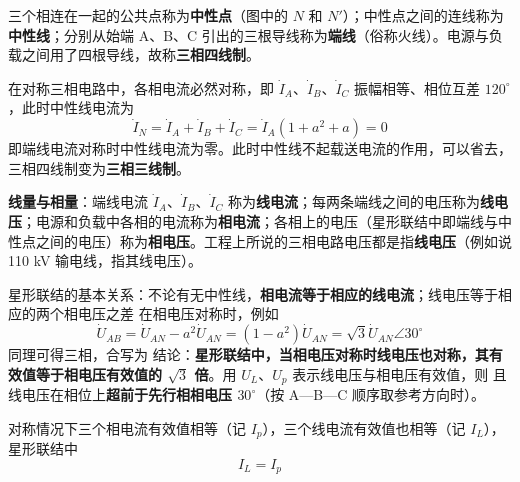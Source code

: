三个相连在一起的公共点称为\textbf{中性点}（图中的 $N$ 和 $N'$）；中性点之间的连线称为\textbf{中性线}；分别从始端 A、B、C 引出的三根导线称为\textbf{端线}（俗称火线）。电源与负载之间用了四根导线，故称\textbf{三相四线制}。

在对称三相电路中，各相电流必然对称，即 $\dot{I}_A$、$\dot{I}_B$、$\dot{I}_C$ 振幅相等、相位互差 $120^\circ$，此时中性线电流为
\begin{equation}
\dot{I}_N=\dot{I}_A+\dot{I}_B+\dot{I}_C=\dot{I}_A\left(1+a^2+a\right)=0
\end{equation}
即端线电流对称时中性线电流为零。此时中性线不起载送电流的作用，可以省去，三相四线制变为\textbf{三相三线制}。

\textbf{线量与相量}：端线电流 $\dot{I}_A$、$\dot{I}_B$、$\dot{I}_C$ 称为\textbf{线电流}；每两条端线之间的电压称为\textbf{线电压}；电源和负载中各相的电流称为\textbf{相电流}；各相上的电压（星形联结中即端线与中性点之间的电压）称为\textbf{相电压}。工程上所说的三相电路电压都是指\textbf{线电压}（例如说 110 kV 输电线，指其线电压）。

星形联结的基本关系：不论有无中性线，\textbf{相电流等于相应的线电流}；线电压等于相应的两个相电压之差
在相电压对称时，例如
\begin{equation}
\dot{U}_{AB}=\dot{U}_{AN}-a^2\dot{U}_{AN}=\left(1-a^2\right)\dot{U}_{AN}=\sqrt{3}\dot{U}_{AN}\angle30^\circ
\end{equation}
同理可得三相，合写为
结论：\textbf{星形联结中，当相电压对称时线电压也对称，其有效值等于相电压有效值的 $\sqrt{3}$ 倍}。用 $U_L$、$U_p$ 表示线电压与相电压有效值，则
且线电压在相位上\textbf{超前于先行相相电压 $30^\circ$}（按 A—B—C 顺序取参考方向时）。

对称情况下三个相电流有效值相等（记 $I_p$），三个线电流有效值也相等（记 $I_L$），星形联结中
\begin{equation}
I_L=I_p
\end{equation}



